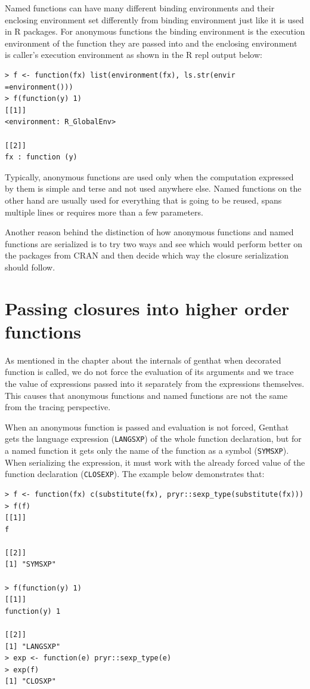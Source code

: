 \documentclass[thesis=B,english]{FITthesis}[2012/10/20]
\begin{document}
Named functions can have many different binding environments and their enclosing environment set differently from binding environment just like it is used in R packages. For anonymous functions the binding environment is the execution environment of the function they are passed into and the enclosing environment is caller’s execution environment as shown in the R repl output below:

\begin{verbatim}
> f <- function(fx) list(environment(fx), ls.str(envir =environment()))
> f(function(y) 1)
[[1]]
<environment: R_GlobalEnv>

[[2]]
fx : function (y)
\end{verbatim}

Typically, anonymous functions are used only when the computation expressed by them is simple and terse and not used anywhere else. Named functions on the other hand are usually used for everything that is going to be reused, spans multiple lines or requires more than a few parameters. 

Another reason behind the distinction of how anonymous functions and named functions are serialized is to try two ways and see which would perform better on the packages from CRAN and then decide which way the closure serialization should follow.

\section{Passing closures into higher order functions}
As mentioned in the chapter about the internals of genthat when decorated function is called, we do not force the evaluation of its arguments and we trace the value of expressions passed into it separately from the expressions themselves. This causes that anonymous functions and named functions are not the same from the tracing perspective. 

When an anonymous function is passed and evaluation is not forced, Genthat gets the language expression (\verb|LANGSXP|) of the whole function declaration, but for a named function it gets only the name of the function as a symbol (\verb|SYMSXP|). When serializing the expression, it must work with the already forced value of the function declaration (\verb|CLOSEXP|). The example below demonstrates that:

\begin{verbatim}
> f <- function(fx) c(substitute(fx), pryr::sexp_type(substitute(fx)))
> f(f)
[[1]]
f

[[2]]
[1] "SYMSXP"

> f(function(y) 1)
[[1]]
function(y) 1

[[2]]
[1] "LANGSXP"
> exp <- function(e) pryr::sexp_type(e)
> exp(f)
[1] "CLOSXP"
\end{verbatim}
\end{document}
